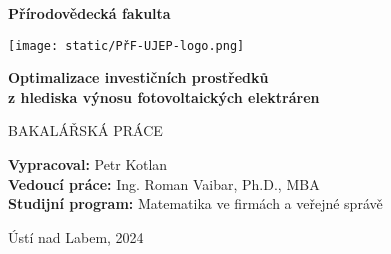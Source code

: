 \begin{titlepage}
    \begin{center}
        \Huge

        \textbf{\textsf{}}
            
        \vspace{1cm}
        \LARGE
        \textbf{\textsf{Přírodovědecká fakulta}}
        
        \vspace{2cm}
        \texttt{[image: static/PřF-UJEP-logo.png]}
        \vspace{3cm}
            
        \textbf{\textsf{Optimalizace investičních prostředků \\z hlediska výnosu fotovoltaických elektráren}}
        
        \vspace{1cm}

        \large
        BAKALÁŘSKÁ PRÁCE

        \vfill

            \begin{flushleft}
                
            \large
            \textbf{Vypracoval:} Petr Kotlan \\
            \vspace{0.3cm}
            \textbf{Vedoucí práce:} Ing. Roman Vaibar, Ph.D., MBA \\
            \vspace{1.5cm}
            \textbf{Studijní program:} Matematika ve firmách a veřejné správě
        \end{flushleft}

        \vspace{1.5cm}
        
        \LARGE
        Ústí nad Labem, 2024

    \end{center}
\end{titlepage}
